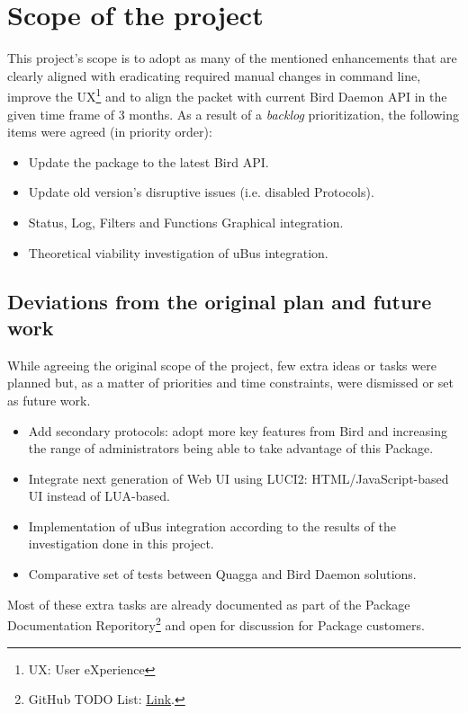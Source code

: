 \section{Scope of the project}
\label{sec:sotp}
This project's scope is to adopt as many of the mentioned enhancements that are clearly aligned with eradicating required manual changes in command line, improve the UX\footnote{UX: User eXperience} and to align the packet with current Bird Daemon API in the given time frame of 3 months. As a result of a \textit{backlog} prioritization, the following items were agreed (in priority order):

\begin{itemize}
    \item Update the package to the latest Bird API.
    \item Update old version's disruptive issues (i.e. disabled Protocols).
    \item Status, Log, Filters and Functions Graphical integration.
    \item Theoretical viability investigation of uBus integration.
\end{itemize}


\subsection{Deviations from the original plan and future  work}
While agreeing the original scope of the project, few extra ideas or tasks were planned but, as a matter of priorities and time constraints, were dismissed or set as future work.

\begin{itemize}
    \item Add secondary protocols: adopt more key features from Bird and increasing the range of administrators being able to take advantage of this Package.
    \item Integrate next generation of Web UI using LUCI2: HTML/JavaScript-based UI instead of LUA-based.
    \item Implementation of uBus integration according to the results of the investigation done in this project.
    \item Comparative set of tests between Quagga and Bird Daemon solutions.
\end{itemize}

Most of these extra tasks are already documented as part of the Package Documentation Reporitory\footnote{GitHub TODO List: \href{https://github.com/eloicaso/bgp-bmx6-bird-docn/blob/master/EN/TODO.md}{Link}.} and open for discussion for Package customers.

